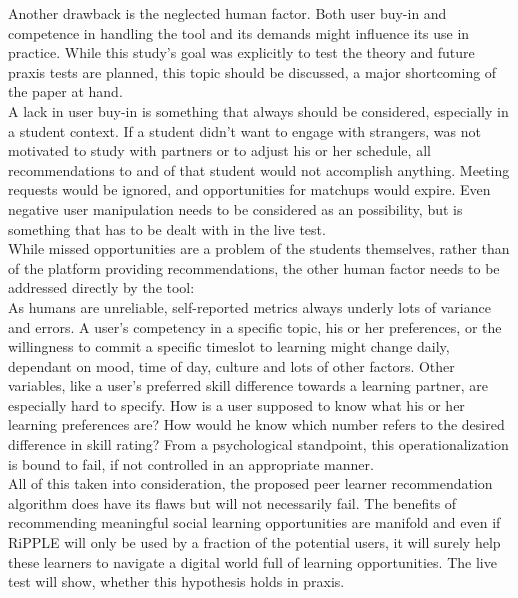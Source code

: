 \documentclass[nochapterpage,bigchapter,linedtoc,longdoc,colorback,accentcolor=tud3b,oneside]{tudreport}
\begin{document}
Another drawback is the neglected human factor. Both user buy-in and competence in handling the tool and its demands might influence its use in practice. While this study's goal was explicitly to test the theory and future praxis tests are planned, this topic should be discussed, a major shortcoming of the paper at hand.\\
A lack in user buy-in is something that always should be considered, especially in a student context. If a student didn't want to engage with strangers, was not motivated to study with partners or to adjust his or her schedule, all recommendations to and of that student would not accomplish anything. Meeting requests would be ignored, and opportunities for matchups would expire. Even negative user manipulation needs to be considered as an possibility, but is something that has to be dealt with in the live test.\\
While missed opportunities are a problem of the students themselves, rather than of the platform providing recommendations, the other human factor needs to be addressed directly by the tool:\\
As humans are unreliable, self-reported metrics always underly lots of variance and errors. A user's competency in a specific topic, his or her preferences, or the willingness to commit a specific timeslot to learning might change daily, dependant on mood, time of day, culture and lots of other factors. \cite{lee2002cultural} \cite{sorensen2008measuring} Other variables, like a user's preferred skill difference towards a learning partner, are especially hard to specify. How is a user supposed to know what his or her learning preferences are? How would he know which number refers to the desired difference in skill rating? From a psychological standpoint, this operationalization is bound to fail, if not controlled in an appropriate manner. \cite{gonyea2005self}\\
All of this taken into consideration, the proposed peer learner recommendation algorithm does have its flaws but will not necessarily fail. The benefits of recommending meaningful social learning opportunities are manifold and even if RiPPLE will only be used by a fraction of the potential users, it will surely help these learners to navigate a digital world full of learning opportunities. The live test will show, whether this hypothesis holds in praxis.\\
\end{document}
